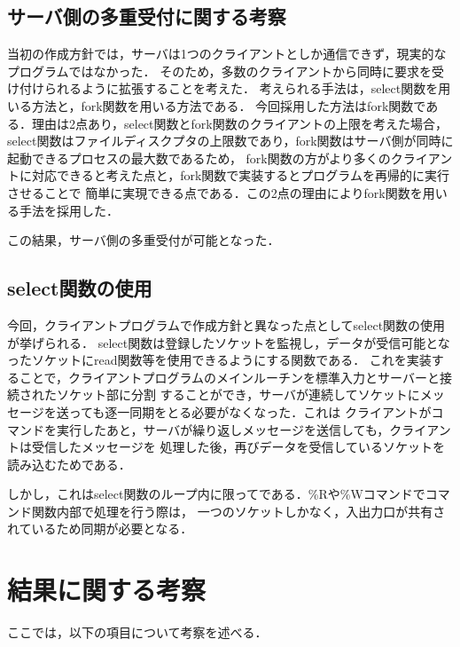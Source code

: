 \documentclass[a4paper,11pt]{jarticle}
\begin{document}
\subsection{サーバ側の多重受付に関する考察}
当初の作成方針では，サーバは1つのクライアントとしか通信できず，現実的なプログラムではなかった．
そのため，多数のクライアントから同時に要求を受け付けられるように拡張することを考えた．
考えられる手法は，select関数を用いる方法と，fork関数を用いる方法である．
今回採用した方法はfork関数である．理由は2点あり，select関数とfork関数のクライアントの上限を考えた場合，
select関数はファイルディスクプタの上限数であり，fork関数はサーバ側が同時に起動できるプロセスの最大数であるため，
fork関数の方がより多くのクライアントに対応できると考えた点と，fork関数で実装するとプログラムを再帰的に実行させることで
簡単に実現できる点である．この2点の理由によりfork関数を用いる手法を採用した．

この結果，サーバ側の多重受付が可能となった．


\subsection{select関数の使用}
今回，クライアントプログラムで作成方針と異なった点としてselect関数の使用が挙げられる．
select関数は登録したソケットを監視し，データが受信可能となったソケットにread関数等を使用できるようにする関数である．
これを実装することで，クライアントプログラムのメインルーチンを標準入力とサーバーと接続されたソケット部に分割
することができ，サーバが連続してソケットにメッセージを送っても逐一同期をとる必要がなくなった．これは
クライアントがコマンドを実行したあと，サーバが繰り返しメッセージを送信しても，クライアントは受信したメッセージを
処理した後，再びデータを受信しているソケットを読み込むためである．

しかし，これはselect関数のループ内に限ってである．\%Rや\%Wコマンドでコマンド関数内部で処理を行う際は，
一つのソケットしかなく，入出力口が共有されているため同期が必要となる．
\section{結果に関する考察}
ここでは，以下の項目について考察を述べる．
\end{document}
